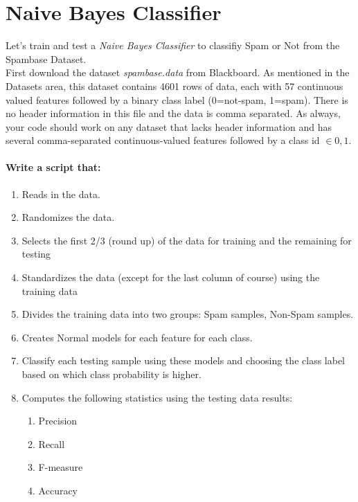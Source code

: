 \documentclass[12pt]{article}
\begin{document}
\newpage
\section{Naive Bayes Classifier}\label{naive}
Let's train and test a \emph{Naive Bayes Classifier} to classifiy Spam or Not from the Spambase Dataset.\\

\noindent
First download the dataset \emph{spambase.data} from Blackboard.  As mentioned in the Datasets area, this dataset contains 4601 rows of data, each with 57 continuous valued features followed by a binary class label (0=not-spam, 1=spam).  There is no header information in this file and the data is comma separated.  As always, your code should work on any dataset that lacks header information and has several comma-separated continuous-valued features followed by a class id $\in {0,1}$.\\

\noindent
\paragraph{Write a script that:}
\begin{enumerate}
  \item Reads in the data.
  \item Randomizes the data.
  \item Selects the first 2/3 (round up) of the data for training and the remaining for testing
  \item Standardizes the data (except for the last column of course) using the training data
  \item Divides the training data into two groups: Spam samples, Non-Spam samples.
  \item Creates Normal models for each feature for each class.
  \item Classify each testing sample using these models and choosing the class label based on which class probability is higher.
  \item Computes the following statistics using the testing data results:
    \begin{enumerate}
        \item Precision
        \item Recall
        \item F-measure
        \item Accuracy
    \end{enumerate}
\end{enumerate}
\end{document}
